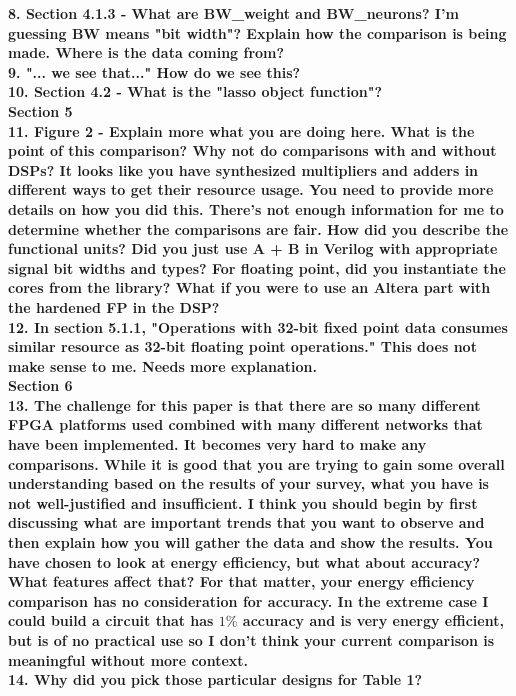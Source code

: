 \documentclass[12pt]{paper}
\newcommand{\comment}[1]{\noindent\textbf{#1}\\}
\begin{document}
\comment{8. Section 4.1.3 - What are BW\_weight and BW\_neurons? I'm guessing BW means "bit width"? Explain how the comparison is being made. Where is the data coming from?}

\comment{9. "... we see that..." How do we see this?}

\comment{10. Section 4.2 - What is the "lasso object function"?}

{\noindent\textbf{Section 5}}\\

\comment{11. Figure 2 - Explain more what you are doing here. What is the point of this comparison? Why not do comparisons with and without DSPs? It looks like you have synthesized multipliers and adders in different ways to get their resource usage. You need to provide more details on how you did this. There's not enough information for me to determine whether the comparisons are fair. How did you describe the functional units? Did you just use A + B in Verilog with appropriate signal bit widths and types? For floating point, did you instantiate the cores from the library? What if you were to use an Altera part with the hardened FP in the DSP?}

\comment{12. In section 5.1.1, "Operations with 32-bit fixed point data consumes similar resource as 32-bit floating point operations." This does not make sense to me. Needs more explanation.}

{\noindent\textbf{Section 6}}\\

\comment{13. The challenge for this paper is that there are so many different FPGA platforms used combined with many different networks that have been implemented.  It becomes very hard to make any comparisons.  While it is good that you are trying to gain some overall understanding based on the results of your survey, what you have is not well-justified and insufficient. I think you should begin by first discussing what are important trends that you want to observe and then explain how you will gather the data and show the results. You have chosen to look at energy efficiency, but what about accuracy? What features affect that?  For that matter, your energy efficiency comparison has no consideration for accuracy. In the extreme case I could build a circuit that has $1\%$ accuracy and is very energy efficient, but is of no practical use so I don't think your current comparison is meaningful without more context.}

\comment{14. Why did you pick those particular designs for Table 1?}
\end{document}
